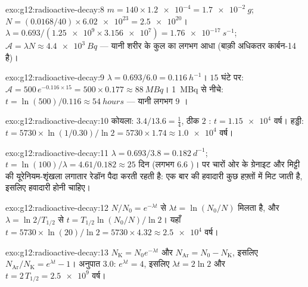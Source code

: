 \begin{solution}{exo:g12:radioactive-decay:8}
$m = 140 \times \num{1.2e-4} = \qty{1.7e-2}{g}$; $N = (0.0168/40) \times \num{6.02e23} = \num{2.5e20}$। $\lambda = 0.693/(\num{1.25e9} \times \num{3.156e7}) =
\qty{1.76e-17}{s^{-1}}$; $\mathcal A = \lambda N \approx
\qty{4.4e3}{Bq}$ --- यानी शरीर के कुल का लगभग आधा (बाक़ी अधिकतर
कार्बन-14 है)।
\end{solution}

\begin{solution}{exo:g12:radioactive-decay:9}
$\lambda = 0.693/6.0 = \qty{0.116}{h^{-1}}$। $15$ घंटे पर: $\mathcal A = 500\,e^{-0.116 \times 15} = 500 \times 0.177 \approx
\qty{88}{MBq}$। \qty{1}{MBq} से नीचे: $t = \ln(500)/0.116 \approx \qty{54}{hours}$ --- यानी लगभग $9$
।
\end{solution}

\begin{solution}{exo:g12:radioactive-decay:10}
कोयला: $3.4/13.6 = \tfrac14$, ठीक $2$ : $t = \num{1.15e4}$ वर्ष। हड्डी: $t = \num{5730} \times \ln(1/0.30)/\ln 2 = \num{5730} \times 1.74
\approx \num{1.0e4}$ वर्ष।
\end{solution}

\begin{solution}{exo:g12:radioactive-decay:11}
$\lambda = 0.693/3.8 = \qty{0.182}{d^{-1}}$; $t = \ln(100)/\lambda = 4.61/0.182 \approx 25$ दिन (लगभग $6.6$ )। पर चारों ओर के ग्रेनाइट और मिट्टी
की यूरेनियम-शृंखला लगातार रेडॉन पैदा करती रहती है: एक बार की हवादारी कुछ
हफ़्तों में मिट जाती है, इसलिए हवादारी  होनी चाहिए।
\end{solution}

\begin{solution}{exo:g12:radioactive-decay:12}
$N/N_0 = e^{-\lambda t}$ से $\lambda t = \ln(N_0/N)$ मिलता है, और $\lambda = \ln 2/T_{1/2}$ से $t = T_{1/2}\ln(N_0/N)/\ln 2$। यहाँ $t = \num{5730} \times \ln(20)/\ln 2 = \num{5730} \times 4.32
\approx \num{2.5e4}$ वर्ष।
\end{solution}

\begin{solution}{exo:g12:radioactive-decay:13}
$N_{\mathrm K} = N_0 e^{-\lambda t}$ और $N_{\mathrm{Ar}} = N_0 - N_{\mathrm K}$, इसलिए $N_{\mathrm{Ar}}/N_{\mathrm K} = e^{\lambda t} - 1$। अनुपात $3.0$: $e^{\lambda t} = 4$, इसलिए $\lambda t = 2\ln 2$ और $t = 2\,T_{1/2} = \num{2.5e9}$
वर्ष।
\end{solution}

